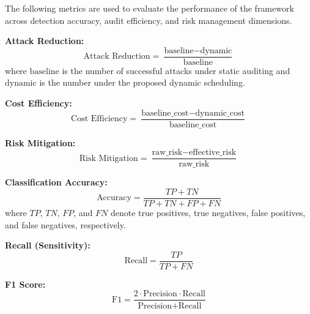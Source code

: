 The following metrics are used to evaluate the performance of the framework across detection accuracy, audit efficiency, and risk management dimensions.

\par \vspace{0.25cm}
\noindent
\textbf{Attack Reduction:}
\begin{equation}
\text{Attack Reduction} = \frac{\text{baseline} - \text{dynamic}}{\text{baseline}}
\label{eq:attack_reduction}
\end{equation}
where $\text{baseline}$ is the number of successful attacks under static auditing and $\text{dynamic}$ is the number under the proposed dynamic scheduling.

\par \vspace{0.25cm}
\noindent
\textbf{Cost Efficiency:}
\begin{equation}
\text{Cost Efficiency} = \frac{\text{baseline\_cost} - \text{dynamic\_cost}}{\text{baseline\_cost}}
\label{eq:cost_efficiency}
\end{equation}

\par \vspace{0.25cm}
\noindent
\textbf{Risk Mitigation:}
\begin{equation}
\text{Risk Mitigation} = \frac{\text{raw\_risk} - \text{effective\_risk}}{\text{raw\_risk}}
\label{eq:risk_mitigation}
\end{equation}

\par \vspace{0.25cm}
\noindent
\textbf{Classification Accuracy:}
\begin{equation}
\text{Accuracy} = \frac{TP + TN}{TP + TN + FP + FN}
\label{eq:accuracy}
\end{equation}
where $TP$, $TN$, $FP$, and $FN$ denote true positives, true negatives, false positives, and false negatives, respectively.

\par \vspace{0.25cm}
\noindent
\textbf{Recall (Sensitivity):}
\begin{equation}
\text{Recall} = \frac{TP}{TP + FN}
\label{eq:recall}
\end{equation}

\par \vspace{0.25cm}
\noindent
\textbf{F1 Score:}
\begin{equation}
\text{F1} = \frac{2 \cdot \text{Precision} \cdot \text{Recall}}{\text{Precision} + \text{Recall}}
\label{eq:f1}
\end{equation}


